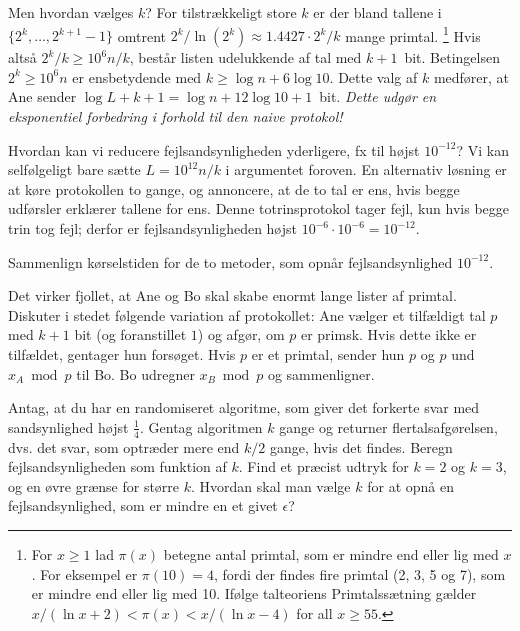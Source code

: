 Men hvordan vælges $k$?
For tilstrækkeligt store $k$ er der bland tallene i $\{2^k,\ldots,2^{k+1}-1\}$ omtrent $2^k/\ln(2^k)\approx \num{1,4427}\cdot 2^k/k$ mange primtal.%
\footnote{For $x\ge1$ lad $\pi(x)$ betegne antal primtal, som er mindre end eller lig med $x$.
For eksempel er $\pi(10) = 4$, fordi der findes fire primtal (2, 3, 5 og 7), som er mindre end eller lig med 10.
Ifølge talteoriens Primtalssætning gælder $x/(\ln x + 2) < \pi(x) < x/(\ln x - 4)$ for all $x\ge 55$.
}
Hvis altså $2^k/k  \ge  10^6 n/k$, består listen udelukkende af tal med $k+1$~bit.
Betingelsen $2^k \ge  10^6 n$ er ensbetydende med $k \ge \log n + 6\log 10$.
Dette valg af $k$ medfører, at Ane sender  $\log L + k + 1 = \log n + 12 \log 10 + 1$~bit.
\emph{Dette udgør en eksponentiel forbedring i forhold til den naive protokol!}

Hvordan kan vi reducere fejlsandsynligheden yderligere, fx til højst $10^{-12}$?
Vi kan selfølgeligt bare sætte $L = 10^{12} n/k$ i argumentet foroven.
En alternativ løsning er at køre protokollen to gange, og annoncere, at de to tal er ens, hvis begge udførsler erklærer tallene for ens.
Denne totrinsprotokol tager fejl, kun hvis begge trin tog fejl; derfor er fejlsandsynligheden
højst $10^{-6} \cdot 10^{-6} = 10^{-12}$.  


\begin{exerc}
  Sammenlign kørselstiden for de to metoder, som opnår fejlsandsynlighed $10^{-12}$.
\end{exerc}

\begin{exerc} 
  Det virker fjollet, at Ane og Bo skal skabe enormt lange lister af primtal.
  Diskuter i stedet følgende variation af protokollet:
  Ane vælger et tilfældigt tal $p$ med $k+1$ bit (og foranstillet $1$) og afgør, om $p$ er primsk.
  Hvis dette ikke er tilfældet, gentager hun forsøget.
  Hvis $p$ er et primtal, sender hun $p$ og $p$ und $x_A\bmod p$ til Bo.
  Bo udregner $x_B\bmod p$ og sammenligner. 
\end{exerc}

\begin{exerc} 
  Antag, at du har en randomiseret algoritme, som giver det forkerte svar med sandsynlighed højst $\frac14$.
  Gentag algoritmen $k$ gange og returner flertalsafgørelsen, dvs. det svar, som optræder mere end $k/2$ gange, hvis det findes. 
  Beregn fejlsandsynligheden som funktion af $k$.
  Find et præcist udtryk for  $k=2$ og $k=3$, og en øvre grænse for større $k$.
  Hvordan skal man vælge $k$ for at opnå en fejlsandsynlighed, som er mindre en et givet $\epsilon$?
\end{exerc}

